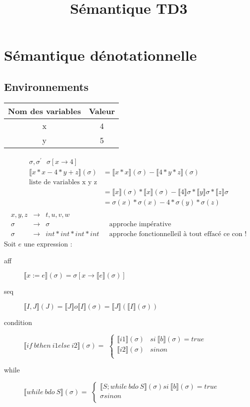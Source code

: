 \documentclass[11pt,a4paper]{article}
\title{Sémantique TD3}
\newcommand{\llbr}{\llbracket}
\newcommand{\rrbr}{\rrbracket}
\begin{document}
	\section*{Sémantique dénotationnelle}
	\subsection*{Environnements}
	\begin{tabular}{|c|c|}
		\hline 
		Nom des variables & Valeur \\ 
		\hline 
		x & 4 \\ 
		\hline 
		y & 5 \\ 
		\hline 
	\end{tabular}
	\begin{align*}
		\sigma ,{\sigma }^{\prime }\ \ \ \sigma \left[x{\to }4\right]\\
		  \llbr x*x - 4*y+z  \rrbr (\sigma) &=   \llbr x*x  \rrbr (\sigma) -   \llbr 4*y*z  \rrbr (\sigma)\\
		\text{liste de variables x y z}&\\
		&=   \llbr x  \rrbr (\sigma) *   \llbr x  \rrbr (\sigma) -   \llbr 4  \rrbr \sigma*  \llbr y  \rrbr \sigma*  \llbr z  \rrbr \sigma\\
		&= \sigma(x) * \sigma(x) - 4 * \sigma(y) * \sigma(z)\\
	\end{align*}
	\begin{align*}
		x,y,z &\to &t,u,v,w\\
		\sigma &\to &\sigma &\ \ \ \text{approche impérative}\\
		\sigma &\to &int * int * int * int &\ \ \ \text{approche fonctionnelle}
		\text{il à tout effacé ce con !}
	\end{align*}
	Soit $e$ une expression :
	\begin{description}
		\item[aff] $  \llbr x := e  \rrbr (\sigma) = \sigma[x \to   \llbr e  \rrbr (\sigma)]$
		\item[seq]  $  \llbr I, J  \rrbr (J) =   \llbr J  \rrbr  o   \llbr I  \rrbr (\sigma) =   \llbr J  \rrbr (  \llbr I  \rrbr (\sigma))$
		\item[condition] $  \llbr if\ b then\ i1 else\ i2  \rrbr (\sigma) =$
		$\begin{cases}
			  \llbr i1  \rrbr (\sigma) & si\   \llbr b  \rrbr (\sigma) = true\\
			  \llbr i2  \rrbr (\sigma) & sinon\\
		\end{cases}$
		\item[while] $  \llbr while\ b do\ S  \rrbr (\sigma) =$
		$\begin{cases}
			  \llbr S; while\ b do\ S  \rrbr (\sigma) si\   \llbr b  \rrbr (\sigma) = true\\
			\sigma sinon\\
		\end{cases}$
	\end{description}
	\newpage
\end{document}
